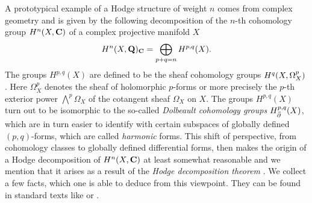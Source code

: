 A prototypical example of a Hodge structure of weight $n$ comes from complex geometry and is given by the following decomposition of the $n$-th cohomology group $H^{n}(X, \mathbf C)$ of a complex projective manifold $X$
\begin{equation}
    \label{eq: Hodge decompositon on complex manifold}
    H^n(X, \mathbf Q)_\mathbf C = \bigoplus_{p+q = n} H^{p,q}(X).
\end{equation}
The groups $H^{p,q}(X)$ are defined to be the sheaf cohomology groups $H^{q}(X, \Omega_X^p)$. 
Here $\Omega_X^p$ denotes the sheaf of holomorphic $p$-forms or more precisely the $p$-th exterior power $\bigwedge^p \Omega_X$ of the cotangent sheaf $\Omega_X$ on $X$. 
The groups $H^{p,q}(X)$ turn out to be isomorphic to the so-called \emph{Dolbeault cohomology groups} $H^{p,q}_{\,\overline{\!{\partial}}}(X)$, which are in turn easier to identify with certain subspaces of globally defined $(p,q)$-forms, which are called \emph{harmonic} forms. This shift of perspective, from cohomology classes to globally defined differential forms, then makes the origin of a Hodge decomposition of $H^{n}(X, \mathbf C)$ at least somewhat reasonable and we mention that it arises as a result of the \emph{Hodge decomposition theorem} \cite[\S 0.6]{GriffithsHarris1994}.
We collect a few facts, which one is able to deduce from this viewpoint. They can be found in standard texts like \cite{GriffithsHarris1994} or \cite{Voisin2002}.
